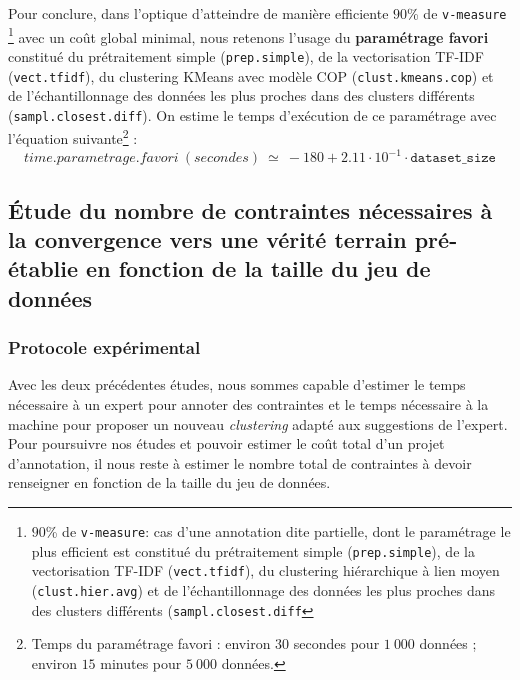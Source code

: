 			Pour conclure, dans l'optique d'atteindre de manière efficiente $90$\% de \texttt{v-measure}
			\footnote{$90$\% de \texttt{v-measure}: cas d'une annotation dite partielle, dont le paramétrage le plus efficient est constitué du prétraitement simple (\texttt{prep.simple}), de la vectorisation TF-IDF (\texttt{vect.tfidf}), du clustering hiérarchique à lien moyen (\texttt{clust.hier.avg}) et de l'échantillonnage des données les plus proches dans des clusters différents (\texttt{sampl.closest.diff}}
			avec un coût global minimal, nous retenons l'usage du \textbf{paramétrage favori} constitué du prétraitement simple (\texttt{prep.simple}), de la vectorisation TF-IDF (\texttt{vect.tfidf}), du clustering KMeans avec modèle COP (\texttt{clust.kmeans.cop}) et de l'échantillonnage des données les plus proches dans des clusters différents (\texttt{sampl.closest.diff}).
			On estime le temps d'exécution de ce paramétrage avec l'équation suivante\footnote{Temps du paramétrage favori : environ $30$ secondes pour $1~000$ données ; environ $15$ minutes pour $5~000$ données.} :
			\begin{equation}
				time.parametrage.favori~(secondes)~
				\simeq~-180 + 2.11 \cdot 10^{-1} \cdot \texttt{dataset\_size}
			\end{equation}
	
	\subsection{Étude du nombre de contraintes nécessaires à la convergence vers une vérité terrain pré-établie en fonction de la taille du jeu de données}
	\label{section:4.3.3-ETUDE-COUT-NOMBRE-CONTRAINTES}
	
		\subsubsection{Protocole expérimental}
			
			Avec les deux précédentes études, nous sommes capable d'estimer le temps nécessaire à un expert pour annoter des contraintes et le temps nécessaire à la machine pour proposer un nouveau \textit{clustering} adapté aux suggestions de l'expert.
			Pour poursuivre nos études et pouvoir estimer le coût total d'un projet d'annotation, il nous reste à estimer le nombre total de contraintes à devoir renseigner en fonction de la taille du jeu de données.
			
